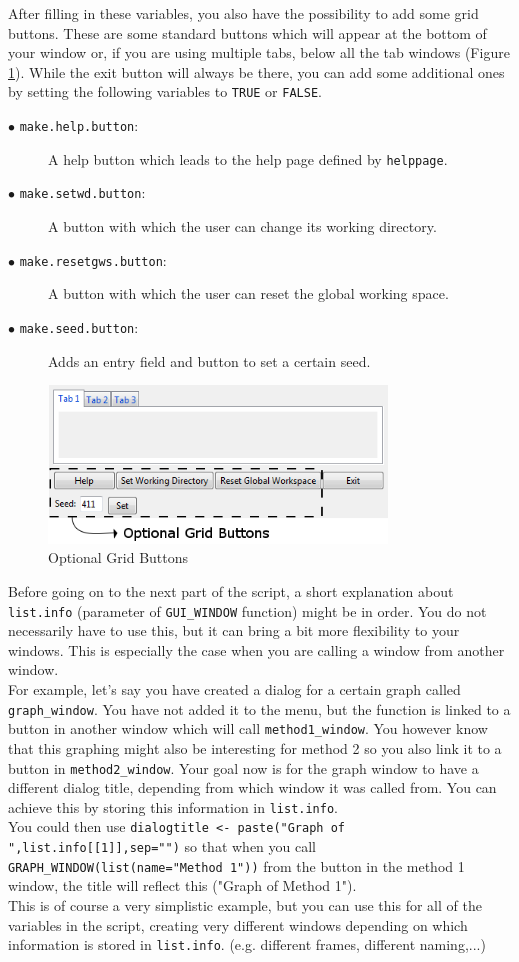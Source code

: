 \documentclass[a4paper]{article}\usepackage[]{graphicx}\usepackage[]{color}
\begin{document}
\noindent After filling in these variables, you also have the possibility to add
some grid buttons. These are some standard buttons which will appear at the
bottom of your window or, if you are using multiple tabs, below all the tab
windows (Figure \ref{optionalgrid}). While the exit button will always be there,
you can add some additional ones by setting the following variables to
\verb|TRUE| or \verb|FALSE|. 
\begin{description}
  \item[$\bullet$ \texttt{make.help.button}:] A help button which leads to the
  help page defined by \verb|helppage|.
  \item[$\bullet$ \texttt{make.setwd.button}:] A button with which the user can
  change its working directory.
  \item[$\bullet$ \texttt{make.resetgws.button}:] A button with which the user
  can reset the global working space.
  \item[$\bullet$ \texttt{make.seed.button}:] Adds an entry field and button to
  set a certain seed.
\end{description}
\begin{figure}[H]
\centering
\includegraphics[width=9cm]{figures/optionalgrid.png}
\caption{Optional Grid Buttons \label{optionalgrid}}
\end{figure}

\noindent Before going on to the next part of the script, a short explanation
about \verb|list.info| (parameter of \verb|GUI_WINDOW| function) might be in
order. You do not necessarily have to use this, but it can bring a bit more
flexibility to your windows. This is especially the case when you are calling
a window from another window.\\
For example, let's say you have created a dialog for a certain graph called
\verb|graph_window|. You have not added it to the menu, but the function is
linked to a button in another window which will call \verb|method1_window|. You
however know that this graphing might also be interesting for method 2 so you
also link it to a button in \verb|method2_window|. Your goal now is for the
graph window to have a different dialog title, depending from which window it
was called from. You can achieve this by storing this information in
\verb|list.info|. \\
You could then use 
\verb|dialogtitle <- paste("Graph of ",list.info[[1]],sep="")| so that when you
call \verb|GRAPH_WINDOW(list(name="Method 1"))| from the button in the method 1
window, the title will reflect this ("Graph of Method 1").\\
This is of course a very simplistic example, but you can use this for all of the
variables in the script, creating very different windows depending on which
information is stored in \verb|list.info|. (e.g. different frames, different naming,...)
\end{document}
